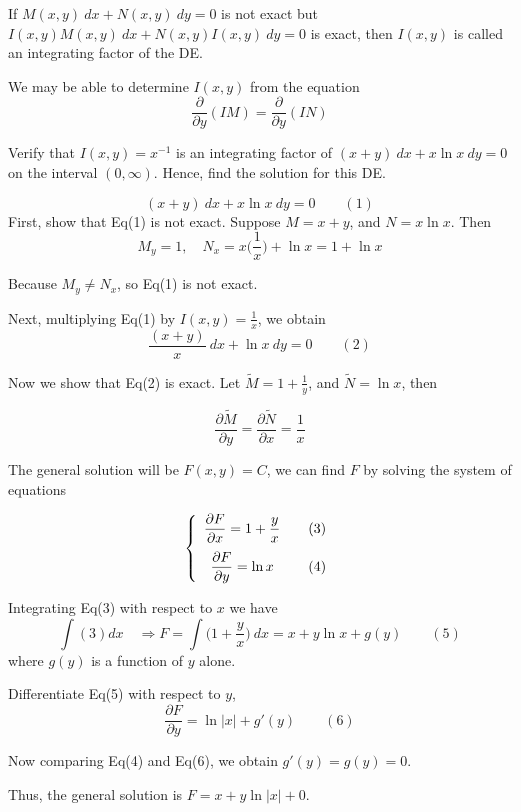 \begin{definition}
    If $M(x,y)\>dx + N(x,y)\>dy = 0$ is not exact but 
    $I(x,y)M(x,y)\>dx + N(x,y)I(x,y)\>dy = 0$ is exact, then $I(x,y)$ is called 
    an integrating factor of the DE.
\end{definition}
\begin{remark}
    We may be able to determine $I(x,y)$ from the equation 
    \begin{equation}
        \frac{\partial}{\partial y}(IM) = \frac{\partial}{\partial y}(IN)
    \end{equation}
\end{remark}

\begin{example}
    Verify that $I(x,y) = x^{-1}$ is an integrating factor of 
    $(x+y)\> dx + x\ln x \> dy = 0$ on the interval $(0, \infty)$. Hence, find the 
    solution for this DE.
\end{example}
\begin{solution}
    \[
        (x+y)\> dx + x\ln x \> dy = 0 \quad \quad (1)
    \]
    First, show that Eq(1) is not exact. Suppose $M = x+y$, and $N = x\ln x$.
    Then 
    \[
        M_y = 1, \quad N_x = x\biggl(\frac{1}{x}\biggr) + \ln x = 1 + \ln x
    \]

    Because $M_y \neq N_x$, so Eq(1) is not exact.

    Next, multiplying Eq(1) by $\displaystyle I(x,y) = \frac{1}{x}$, we obtain 
    \[
        \frac{(x+y)}{x}\>dx + \ln x \> dy = 0 \quad \quad (2)
    \]

    Now we show that Eq(2) is exact. Let $\displaystyle \tilde{M} = 1 + \frac{1}{y}$, 
    and $\tilde{N} = \ln x$, then 

    \[
        \frac{\partial \tilde{M}}{\partial y} = \frac{\partial \tilde{N}}{\partial x} = \frac{1}{x}
    \]

    The general solution will be $F(x,y) = C$, we can find $F$ by solving 
    the system of equations 

    \[
        \left\{
        \begin{array}{cc}
         \displaystyle \frac{\partial F}{\partial x} = 1+\frac{y}{x} & \quad \refstepcounter{equation}(3)\\[1em]
         \displaystyle \frac{\partial F}{\partial y} = \ln x & \quad \refstepcounter{equation}(4)
        \end{array}
        \right.
    \]

    Integrating Eq(3) with respect to $x$ we have 
    \[
        \int (3) dx \quad \Rightarrow F = \int \biggl(1 + \frac{y}{x}\biggr)\> dx 
        = x + y\ln x + g(y) \quad \quad (5)
    \]
    where $g(y)$ is a function of $y$ alone.

    Differentiate Eq(5) with respect to $y$, 
    \[
        \frac{\partial F}{\partial y} = \ln |x| + g'(y) \quad \quad (6)
    \]

    Now comparing Eq(4) and Eq(6), we obtain $g'(y) = g(y) = 0$.
    
    Thus, the general solution is $F = x + y\ln |x| + 0$.

\end{solution}

